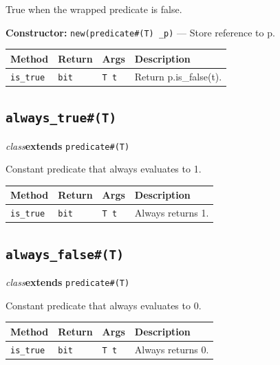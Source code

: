\documentclass[11pt,letterpaper]{report}
\begin{document}
True when the wrapped predicate is false.

\noindent\textbf{Constructor:} \texttt{new(predicate\#(T) \_p)} --- Store reference to p.

\begin{xltabular}{\linewidth}{>{\small}p{1.35in} >{\small}p{1.25in} >{\small}p{0.95in} >{\small}X}
\toprule
\textbf{Method} & \textbf{Return} & \textbf{Args} & \textbf{Description} \\
\midrule
\endhead
\bottomrule
\endfoot
\texttt{is\_true} & \texttt{bit} & \texttt{T t} & Return p.is\_false(t). \\
\end{xltabular}

\subsection*{\texttt{always\_true\#(T)}}
\noindent\small\textit{class}\quad \textbf{extends} \texttt{predicate\#(T)}\par

Constant predicate that always evaluates to 1.

\begin{xltabular}{\linewidth}{>{\small}p{1.35in} >{\small}p{1.25in} >{\small}p{0.95in} >{\small}X}
\toprule
\textbf{Method} & \textbf{Return} & \textbf{Args} & \textbf{Description} \\
\midrule
\endhead
\bottomrule
\endfoot
\texttt{is\_true} & \texttt{bit} & \texttt{T t} & Always returns 1. \\
\end{xltabular}

\subsection*{\texttt{always\_false\#(T)}}
\noindent\small\textit{class}\quad \textbf{extends} \texttt{predicate\#(T)}\par

Constant predicate that always evaluates to 0.

\begin{xltabular}{\linewidth}{>{\small}p{1.35in} >{\small}p{1.25in} >{\small}p{0.95in} >{\small}X}
\toprule
\textbf{Method} & \textbf{Return} & \textbf{Args} & \textbf{Description} \\
\midrule
\endhead
\bottomrule
\endfoot
\texttt{is\_true} & \texttt{bit} & \texttt{T t} & Always returns 0. \\
\end{xltabular}
\end{document}

